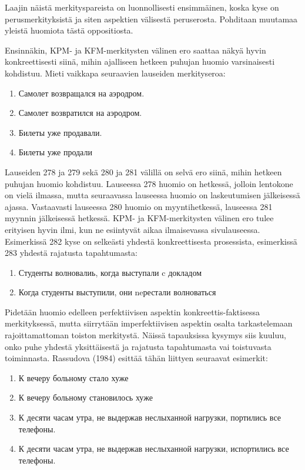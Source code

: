 \documentclass[]{scrreprt}
\providecommand{\tightlist}{%
  \setlength{\itemsep}{0pt}\setlength{\parskip}{0pt}}
\begin{document}
Laajin näistä merkityspareista on luonnollisesti ensimmäinen, koska kyse
on perusmerkityksistä ja siten aspektien välisestä peruserosta.
Pohditaan muutamaa yleistä huomiota tästä oppositiosta.

Ensinnäkin, KPM- ja KFM-merkitysten välinen ero saattaa näkyä hyvin
konkreettisesti siinä, mihin ajalliseen hetkeen puhujan huomio
varsinaisesti kohdistuu. Mieti vaikkapa seuraavien lauseiden
merkityseroa:

\begin{enumerate}
\def\labelenumi{(\arabic{enumi})}
\setcounter{enumi}{277}
\tightlist
\item
  Самолет возвращался на аэродром.
\item
  Самолет возвратился на аэродром.
\item
  Билеты уже продавали.
\item
  Билеты уже продали
\end{enumerate}

Lauseiden 278 ja 279 sekä 280 ja 281 välillä on selvä ero siinä, mihin
hetkeen puhujan huomio kohdistuu. Lauseessa 278 huomio on hetkessä,
jolloin lentokone on vielä ilmassa, mutta seuraavassa lauseessa huomio
on laskeutumisen jälkeisessä ajassa. Vastaavasti lauseessa 280 huomio on
myyntihetkessä, lauseessa 281 myynnin jälkeisessä hetkessä. KPM- ja
KFM-merkitysten välinen ero tulee erityisen hyvin ilmi, kun ne
esiintyvät aikaa ilmaisevassa sivulauseessa. Esimerkissä 282 kyse on
selkeästi yhdestä konkreettisesta prosessista, esimerkissä 283 yhdestä
rajatusta tapahtumasta:

\begin{enumerate}
\def\labelenumi{(\arabic{enumi})}
\setcounter{enumi}{281}
\tightlist
\item
  Студенты волновалиь, когда выступали c докладом
\item
  Когда студенты выступили, они neрестали волноваться
\end{enumerate}

Pidetään huomio edelleen perfektiivisen aspektin konkreettis-faktisessa
merkityksessä, mutta siirrytään imperfektiivisen aspektin osalta
tarkastelemaan rajoittamattoman toiston merkitystä. Näissä tapauksissa
kysymys siis kuuluu, onko puhe yhdestä yksittäisestä ja rajatusta
tapahtumasta vai toistuvasta toiminnasta. Rassudova (1984) esittää tähän
liittyen seuraavat esimerkit:

\begin{enumerate}
\def\labelenumi{(\arabic{enumi})}
\setcounter{enumi}{283}
\tightlist
\item
  К вечеру больному стало хуже
\item
  К вечеру больному становилось хуже
\item
  К десяти часам утра, не выдержав неслыханной нагрузки, портились все
  телефоны.
\item
  К десяти часам утра, не выдержав неслыханной нагрузки, испортились все
  телефоны.
\end{enumerate}
\end{document}
